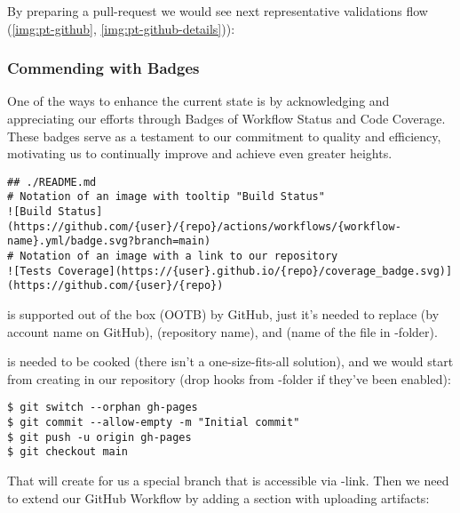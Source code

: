 \noindent By preparing a pull-request we would see next representative validations flow
(\cref{img:pt-github}, \cref{img:pt-github-details})):




\subsubsection{Commending with Badges} \label{a-badges}

One of the ways to enhance the current state is by acknowledging and appreciating our efforts through Badges of Workflow
Status and Code Coverage. These badges serve as a testament to our commitment to quality and efficiency, motivating us
to continually improve and achieve even greater heights.

\begin{lstlisting}[language=terminal]
## ./README.md
# Notation of an image with tooltip "Build Status"
![Build Status](https://github.com/{user}/{repo}/actions/workflows/{workflow-name}.yml/badge.svg?branch=main)
# Notation of an image with a link to our repository
![Tests Coverage](https://{user}.github.io/{repo}/coverage_badge.svg)](https://github.com/{user}/{repo})
\end{lstlisting}

\noindent {} is supported out of the box (OOTB) by GitHub, just it's needed to replace  
(by account name on GitHub),  (repository name), and  (name of the file in 
-folder).

 is needed to be cooked (there isn't a one-size-fits-all solution), and we would start from creating 
 in our repository (drop hooks from -folder if they've been enabled):

\begin{lstlisting}[language=terminal]
$ git switch --orphan gh-pages
$ git commit --allow-empty -m "Initial commit"
$ git push -u origin gh-pages
$ git checkout main
\end{lstlisting}

\noindent That will create for us a special branch that is accessible via -link.
Then we need to extend our GitHub Workflow by adding a section with uploading artifacts:

